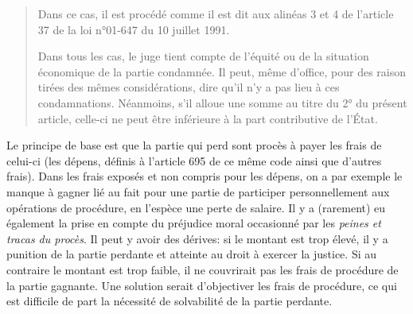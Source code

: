 \documentclass[math]{cours}
\begin{document}
\begin{description}
\begin{quote}
{\begin{enumerate}
					Dans ce cas, il est procédé comme il est dit aux alinéas 3 et 4 de l'article 37 de la loi n°01-647 du 10 juillet 1991.
		\end{enumerate}
		Dans tous les cas, le juge tient compte de l'équité ou de la situation économique de la partie condamnée.
		Il peut, même d'office, pour des raison tirées des mêmes considérations, dire qu'il n'y a pas lieu à ces condamnations.
		Néanmoins, s'il alloue une somme au titre du 2° du présent article, celle-ci ne peut être inférieure à la part contributive de l'État.
	}
		\end{quote}
		Le principe de base est que la partie qui perd sont procès à payer les frais de celui-ci (les dépens, définis à l'article 695 de ce même code ainsi que d'autres frais).
		Dans les frais exposés et non compris pour les dépens, on a par exemple le manque à gagner lié au fait pour une partie de participer personnellement aux opérations de procédure, en l'espèce une perte de salaire.
		Il y a (rarement) eu également la prise en compte du préjudice moral occasionné par les \textit{peines et tracas du procès}.
		Il peut y avoir des dérives: si le montant est trop élevé, il y a punition de la partie perdante et atteinte au droit à exercer la justice.
		Si au contraire le montant est trop faible, il ne couvrirait pas les frais de procédure de la partie gagnante.
		Une solution serait d'objectiver les frais de procédure, ce qui est difficile de part la nécessité de solvabilité de la partie perdante.
\end{description}
\end{document}

